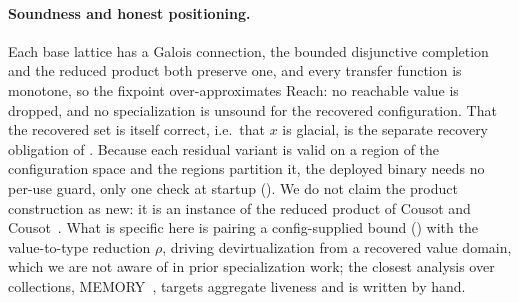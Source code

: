 \paragraph{Soundness and honest positioning.}
Each base lattice has a Galois connection, the bounded disjunctive completion and the reduced product both preserve one, and every transfer function is monotone, so the fixpoint over-approximates $\mathrm{Reach}$: no reachable value is dropped, and no specialization is unsound for the recovered configuration. That the recovered set is itself correct, i.e.\ that $x$ is glacial, is the separate recovery obligation of . Because each residual variant is valid on a region of the configuration space and the regions partition it, the deployed binary needs no per-use guard, only one check at startup (). We do not claim the product construction as new: it is an instance of the reduced product of Cousot and Cousot~\cite{reducedproduct}. What is specific here is pairing a config-supplied bound () with the value-to-type reduction $\rho$, driving devirtualization from a recovered value domain, which we are not aware of in prior specialization work; the closest analysis over collections, MEMORY~\cite{memory_cgo24}, targets aggregate liveness and is written by hand.

